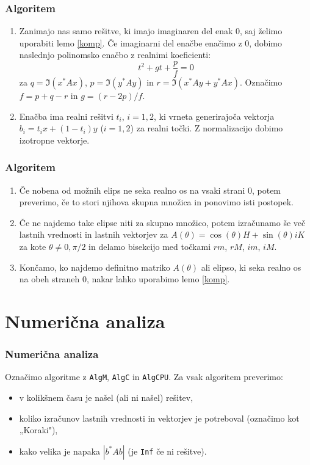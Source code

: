 \documentclass{beamer}
\newcounter{saveenumi}
\newcommand{\seti}{\setcounter{saveenumi}{\value{enumi}}}
\newcommand{\conti}{\setcounter{enumi}{\value{saveenumi}}}
\begin{document}
\begin{frame}
\frametitle{Algoritem}
\begin{enumerate}[1.]
\conti
\item Zanimajo nas samo rešitve, ki imajo imaginaren del enak 0, saj želimo uporabiti lemo \ref{komp}.
Če imaginarni del enačbe enačimo z 0, dobimo naslednjo polinomsko enačbo z realnimi koeficienti:
\begin{equation*}
t^2+gt+\frac{p}{f}=0 
\end{equation*}
za $q=\Im(x^\ast Ax)$, $p=\Im(y^\ast Ay)$ in $r=\Im(x^\ast  Ay + y^\ast Ax)$. Označimo $f=p+q-r$ in $g=(r-2p)/f$.\medskip
\item  Enačba ima realni rešitvi $t_i$, $i=1,2$, ki vrneta generirajoča vektorja $b_i=t_ix+(1-t_i)y$ ($i=1,2$) za realni točki. Z normalizacijo dobimo izotropne vektorje. %
\seti
\end{enumerate}
\end{frame}
\begin{frame}
\frametitle{Algoritem}
\begin{enumerate}[1.]
\conti
\item Če nobena od možnih elips ne seka realno os na vsaki strani 0, potem preverimo, če to stori njihova skupna množica in ponovimo isti postopek.\medskip
\item Če ne najdemo take elipse niti za skupno množico, potem izračunamo še več lastnih vrednosti in lastnih vektorjev za $A(\theta)=\cos(\theta)H+\sin(\theta)iK$ za kote $\theta \not =0,\pi/2$ in delamo bisekcijo med točkami $rm$, $rM$, $im$, $iM$.\medskip
\item Končamo, ko najdemo definitno matriko $A(\theta)$ ali elipso, ki seka realno os na obeh straneh 0, nakar lahko uporabimo lemo \ref{komp}.
\end{enumerate}
\end{frame}

 \section{Numerična analiza}
 \begin{frame}[fragile]
 \frametitle{Numerična analiza}
 Označimo algoritme z \verb+AlgM+, \verb+AlgC+ in \verb+AlgCPU+. Za vsak algoritem preverimo:
 \begin{itemize}
 \item v kolikšnem času je našel (ali ni našel) rešitev,
 \item koliko izračunov lastnih vrednosti in vektorjev je potreboval (označimo kot „Koraki"),
 \item kako velika je napaka $|b^\ast Ab|$ (je \verb+Inf+ če ni rešitve).
 \end{itemize}
 \end{frame}
\end{document}
